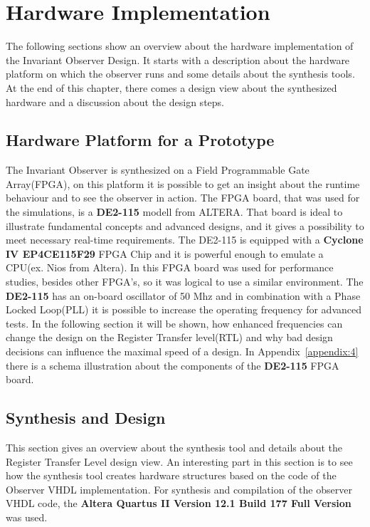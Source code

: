 \chapter{Hardware Implementation}
\label{chapter:3}
\ifpdf
    \graphicspath{{Chapter3/Figs/Raster/}{Chapter3/Figs/PDF/}{Chapter3/Figs/}}
\else
    \graphicspath{{Chapter3/Figs/Vector/}{Chapter3/Figs/}}
\fi


The following sections show an overview about the hardware implementation of the Invariant Observer Design. 
It starts with a description about the hardware platform on which the observer runs and some details
about the synthesis tools. 
At the end of this chapter, there comes a design view about the synthesized hardware and a discussion about 
the design steps. 
\section{Hardware Platform for a Prototype}
The Invariant Observer is synthesized on a Field Programmable Gate Array(FPGA), on this platform it is possible to get an insight
about the runtime behaviour and to see the observer in action. 
The FPGA board, that was used for the simulations, is a \textbf{DE2-115} modell from ALTERA\cite{altera1}. 
That board is ideal to illustrate fundamental concepts and advanced designs, and it gives a possibility
to meet necessary real-time requirements. The DE2-115 is equipped with a \textbf{Cyclone IV EP4CE115F29} 
FPGA Chip and it is powerful enough to emulate a CPU(ex. Nios from Altera). In \cite{RTFMBJ13} this FPGA board was used for performance studies, besides other FPGA's,
so it was logical to use a similar environment. 
The \textbf{DE2-115} has an on-board oscillator of 50 Mhz and in combination with a Phase Locked Loop(PLL) it is possible to increase the operating frequency for advanced tests. 
In the following section it will be shown, how enhanced frequencies can change the design on the Register Transfer level(RTL) and why bad design decisions 
can influence the maximal speed of a design. In Appendix~\ref{appendix:4} there is a schema illustration about the components of the \textbf{DE2-115} FPGA board. 


\section{Synthesis and Design}
This section gives an overview about the synthesis tool and details about the Register Transfer Level design view. 
An interesting part in this section is to see how the synthesis tool creates hardware structures based on the code of the
Observer VHDL implementation. \newline
For synthesis and compilation of the observer VHDL code, the \textbf{Altera Quartus II Version 12.1 Build 177 Full Version} was used. 
